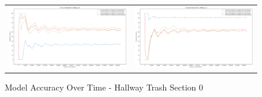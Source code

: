 \begin{figure}
  \begin{tabular}{cc}
    {\includegraphics[width = 3in]{images/results/Future_Predictions_on_hallway_T0.png}} &
    {\includegraphics[width = 3in]{images/results/Historical_Predictions_on_hallway_T0.png}} \\
  \end{tabular}
  \caption{Model Accuracy Over Time - Hallway Trash Section 0}
\end{figure}\\ \\



